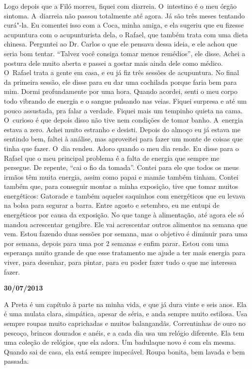Logo depois que a Filó morreu, fiquei com diarreia. O~intestino é o meu
órgão sintoma. A~diarreia não passou totalmente até agora. Já são três
meses tentando curá"-la. Eu comentei isso com a Coca, minha amiga, e ela
sugeriu que eu fizesse acupuntura com o acupunturista dela, o Rafael,
que também trata com uma dieta chinesa. Perguntei ao Dr. Carlos o que
ele pensava dessa ideia, e ele achou que seria bom tentar. ``Talvez você
consiga tomar menos remédios'', ele disse. Achei a postura dele muito
aberta e passei a gostar mais ainda dele como médico. O~Rafael trata a
gente em casa, e eu já fiz três sessões de acupuntura. No final da
primeira sessão, ele disse para eu dar uma cochilada porque faria bem
para mim. Dormi profundamente por uma hora. Quando acordei, senti o meu
corpo todo vibrando de energia e o sangue pulsando nas veias. Fiquei
surpresa e até um pouco assustada, pra falar a verdade. Fiquei mais um
tempinho quieta na cama. O~curioso é que depois disso não tive nem
condições de tomar banho. A~energia estava a zero. Achei muito estranho
e desisti. Depois do almoço eu já estava me sentindo bem, faltei à
análise, mas aproveitei para fazer um monte de coisas que tinha que
fazer. O~dia rendeu. Adoro quando o meu dia rende. Eu disse para o
Rafael que o meu principal problema é a falta de energia que sempre me
persegue. De repente, ``cai o fio da tomada''. Contei para ele que todos
os meus irmãos têm muita energia, assim como papai e mamãe também
tinham. Contei também que, para conseguir montar a minha exposição, tive
que tomar muitos energéticos: Gatorade e também aqueles saquinhos com
energéticos que eu levava na bolsa para segurar a barra. Entre agosto e
setembro, eu me entupi de energéticos por causa da exposição. No que
tange à alimentação, até agora ele só mandou acrescentar gengibre. Ele
vai acrescentar outros alimentos na semana que vem. Estou fazendo duas
sessões por semana, mas o objetivo é diminuir para uma por semana,
depois para uma por 2 semanas e enfim parar. Estou com uma esperança
muito grande de que esse tratamento me ajude a ter mais energia para
viver, para desenhar, para pintar, para eu poder fazer tudo o que me
interessa fazer.

\begin{center}\asterisc{}\textbf{}\end{center}

\begin{flushright}\textbf{30/07/2013}\end{flushright}


A Preta é um capítulo à parte na minha vida, e que já dura vinte e seis
anos. Ela é uma mulata clara, simpática, apesar de séria, e anda sempre
muito estilosa. Usa sempre roupas muito caprichadas e muitos
balangandãs. Correntinhas de ouro no pescoço, brincos dourados e anéis,
e a cada dia usa um relógio diferente. Ela tem uma coleção de relógios,
que ela adora. Um badulaque novo é com ela mesma. Quando sai de casa,
ela está sempre impecável. Roupa bonita, bem lavada e bem passada.

